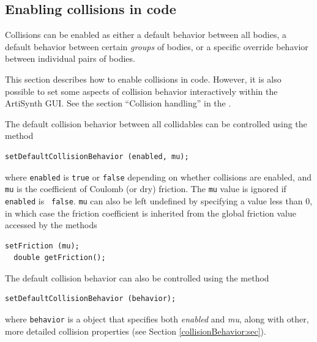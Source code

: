
\subsection{Enabling collisions in code}

Collisions can be enabled as either a default behavior between all
bodies, a default behavior between certain {\it groups} of bodies, or
a specific override behavior between individual pairs of bodies.

\begin{sideblock}
This section describes how to enable collisions in code. However,
it is also possible to set some aspects of collision behavior interactively
within the ArtiSynth GUI. See the section ``Collision handling'' in the
.
\end{sideblock}

The default collision behavior between all collidables can be
controlled using the method
%
\begin{lstlisting}[]
  setDefaultCollisionBehavior (enabled, mu);
\end{lstlisting}
%
where {\tt enabled} is {\tt true} or {\tt false} depending on whether
collisions are enabled, and {\tt mu} is the coefficient of Coulomb (or
dry) friction. The {\tt mu} value is ignored if {\tt enabled} is {\tt
false}. {\tt mu} can also be left undefined by specifying a value less
than 0, in which case the friction coefficient is inherited from the
global friction value accessed by the methods
%
\begin{lstlisting}[]
  setFriction (mu);
  double getFriction();
\end{lstlisting}
%
The default collision behavior can also be controlled
using the method
%
\begin{lstlisting}[]
  setDefaultCollisionBehavior (behavior);
\end{lstlisting}
%
where {\tt behavior} is a
 object that
specifies both {\it enabled} and {\it mu}, along with other, more
detailed collision properties (see Section
\ref{collisionBehavior:sec}).  


